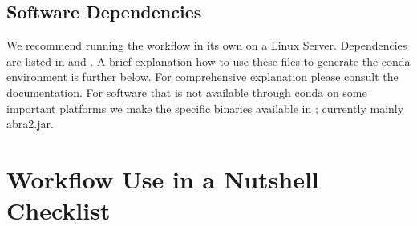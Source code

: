 \documentclass[letterpaper,10pt,english]{sphinxhowto}
\begin{document}
\subsection{Software Dependencies}
\label{\detokenize{index:software-dependencies}}
We recommend running the workflow in its own  on a Linux Server. Dependencies are listed in  and . A brief explanation how to use these files to generate the conda environment is further below. For comprehensive explanation please consult the  documentation. For software that is not available through conda on some important platforms we make the specific binaries available in ; currently mainly abra2.jar.


\section{Workflow Use in a Nutshell \sphinxhyphen{} Checklist}
\label{\detokenize{index:workflow-use-in-a-nutshell-checklist}}
\end{document}
